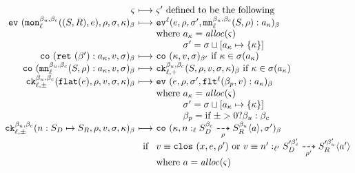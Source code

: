 \documentclass[preprint,onecolumn,9pt]{sigplanconf} %
\begin{document}
\begin{figure*}
  \begin{gather*}
    \begin{array}{@{}r@{\ }c@{\ }l@{}}
      \mstate & \machstep &\mstate' \text{ defined to be the following} \\
      \ev{\sMon{\mmlab_u}{\mmlab_c}{\mlab}{(\mscon,\mtcon),\mexp}, \menv, \msto, \mkont}{\mmlab} &\machstep&
      \ev[^\mlab]{\mexp, \menv, \msto', \spush{\kmon{\mmlab_u}{\mmlab_c}{\mlab}{\mscon, \menv}}{\mkaddr}}{\mmlab} \\
      &&\text{where } \mkaddr = \alloc(\mstate) \\
      &&\phantom{\text{where }} \msto' = \ext{\msto}{\mkaddr}{\setof{\mkont}}
      \\
      \co{\spush{\krt{\mmlab'}}{\mkaddr}, \mval, \msto}{\mmlab} &\machstep&
      \co{\mkont, \mval, \msto}{\mmlab'} \text{ if } \mkont \in \msto(\mkaddr)
      \\
      \co{\spush{\kmon{\mmlab_u}{\mmlab_c}{\mlab}{\mscon, \menv}}{\mkaddr}, \mval, \msto}{\mmlab} &\machstep&
      \ck{\mmlab_u}{\mmlab_c}{\mlab}{+}{\mscon, \menv, \mval, \msto, \mkont}{\mmlab} \text{ if } \mkont \in \msto(\mkaddr)
      \\
      \ck{\mmlab_u}{\mmlab_c}{\mlab}{\mvariance}{\sflat{\mexp}, \menv, \mval, \msto, \mkont}{\mmlab} &\machstep&
      \ev{\mexp, \menv, \msto', \spush{\kflat[^\mlab]{\mmlab_p, \mval}}{\mkaddr}}{\mmlab} \\
      &&\text{where } \mkaddr = \alloc(\mstate) \\
      &&\phantom{\text{where }} \msto' = \ext{\msto}{\mkaddr}{\setof{\mkont}} \\
      &&\phantom{\text{where }} \mmlab_p = \varianceite{\mvariance}{\mmlab_u}{\mmlab_c}
      \\
      \ck{\mmlab_u}{\mmlab_c}{\mlab}{\mvariance}{\sarr{\mname}{\mscon_D}{\mscon_R}, \menv, \mval, \msto, \mkont}{\mmlab} &\machstep&
      \co{\mkont, \blclos{\mname}{\mmlab_u}{\mmlab_c}{\mlab}{\mscon_D}{\mscon_R}{\menv}{\maddr}, \msto'}{\mmlab} \\
      &\text{ if }& \mval \equiv \clos{\mvar, \mexp, \menv'}
       \text{ or }  \mval \equiv \blclos{\mname'}{\mmlab_u'}{\mmlab_c'}{\mlab'}{\mscon_D'}{\mscon_R'}{\menv'}{\maddr'} \\
      &&\text{where } \maddr = \alloc(\mstate) \\

\end{array}
\end{gather*}
\end{figure*}
\end{document}
